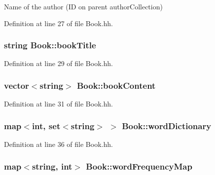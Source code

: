 Name of the author (I\+D on parent author\+Collection) 



Definition at line 27 of file Book.\+hh.

\hypertarget{class_book_a111d7b30bddd6166bd09764f050cfee3}{
\subsubsection[{book\+Title}]{\setlength{\rightskip}{0pt plus 5cm}string Book\+::book\+Title\hspace{0.3cm}{\ttfamily [private]}}}\label{class_book_a111d7b30bddd6166bd09764f050cfee3}


Definition at line 29 of file Book.\+hh.

\hypertarget{class_book_a62ca3f4431b699fa41384c8bab7ef4fa}{
\subsubsection[{book\+Content}]{\setlength{\rightskip}{0pt plus 5cm}vector$<$string$>$ Book\+::book\+Content\hspace{0.3cm}{\ttfamily [private]}}}\label{class_book_a62ca3f4431b699fa41384c8bab7ef4fa}


Definition at line 31 of file Book.\+hh.

\hypertarget{class_book_a3e21a804bd433b6c1b05790856ec973f}{
\subsubsection[{word\+Dictionary}]{\setlength{\rightskip}{0pt plus 5cm}map$<$int, set$<$string$>$ $>$ Book\+::word\+Dictionary\hspace{0.3cm}{\ttfamily [private]}}}\label{class_book_a3e21a804bd433b6c1b05790856ec973f}


Definition at line 36 of file Book.\+hh.

\hypertarget{class_book_a18b73c8d2b492cad5b7b0c187b08dfc0}{
\subsubsection[{word\+Frequency\+Map}]{\setlength{\rightskip}{0pt plus 5cm}map$<$string, int$>$ Book\+::word\+Frequency\+Map\hspace{0.3cm}{\ttfamily [private]}}}\label{class_book_a18b73c8d2b492cad5b7b0c187b08dfc0}


